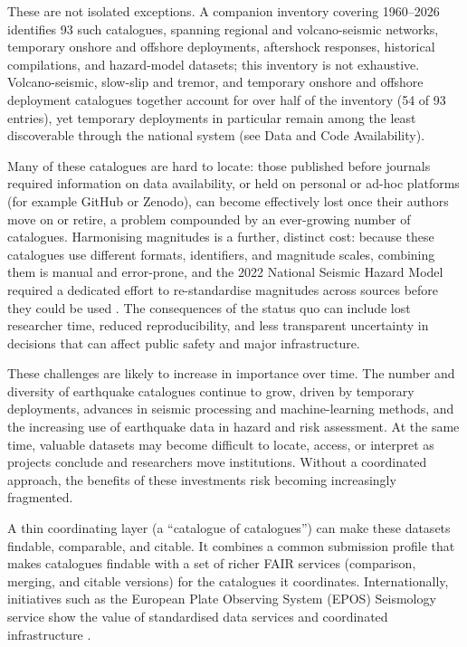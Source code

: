 \documentclass[11pt]{article}
\begin{document}
These are not isolated exceptions. A companion inventory covering 1960--2026 identifies 93 such catalogues, spanning regional and volcano-seismic networks, temporary onshore and offshore deployments, aftershock responses, historical compilations, and hazard-model datasets; this inventory is not exhaustive. Volcano-seismic, slow-slip and tremor, and temporary onshore and offshore deployment catalogues together account for over half of the inventory (54 of 93 entries), yet temporary deployments in particular remain among the least discoverable through the national system (see Data and Code Availability).

Many of these catalogues are hard to locate: those published before journals required information on data availability, or held on personal or ad-hoc platforms (for example GitHub or Zenodo), can become effectively lost once their authors move on or retire, a problem compounded by an ever-growing number of catalogues. Harmonising magnitudes is a further, distinct cost: because these catalogues use different formats, identifiers, and magnitude scales, combining them is manual and error-prone, and the 2022 National Seismic Hazard Model required a dedicated effort to re-standardise magnitudes across sources before they could be used \citep{NSHM2022BSSA, Christophersen2024}. The consequences of the status quo can include lost researcher time, reduced reproducibility, and less transparent uncertainty in decisions that can affect public safety and major infrastructure.

These challenges are likely to increase in importance over time. The number and diversity of earthquake catalogues continue to grow, driven by temporary deployments, advances in seismic processing and machine-learning methods, and the increasing use of earthquake data in hazard and risk assessment. At the same time, valuable datasets may become difficult to locate, access, or interpret as projects conclude and researchers move institutions. Without a coordinated approach, the benefits of these investments risk becoming increasingly fragmented.

A thin coordinating layer (a ``catalogue of catalogues'') can make these datasets findable, comparable, and citable. It combines a common submission profile that makes catalogues findable with a set of richer FAIR services (comparison, merging, and citable versions) for the catalogues it coordinates. Internationally, initiatives such as the European Plate Observing System (EPOS) Seismology service show the value of standardised data services and coordinated infrastructure \citep{EPOSSeisTCS, EPOSSeisDataServices}. 
\end{document}
